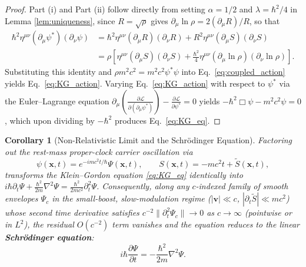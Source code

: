\documentclass[11pt, a4paper]{article}
\newtheorem{corollary}[theorem]{Corollary}
\theoremstyle{definition}
\begin{document}
\begin{proof}
Part (i) and Part (ii) follow directly from setting $\alpha = 1/2$ and $\lambda = \hbar^2/4$ in Lemma \ref{lem:uniqueness}, since $R = \sqrt{\rho}$ gives $\partial_\mu \ln\rho = 2(\partial_\mu R)/R$, so that
\begin{equation}
\begin{aligned}
\hbar^2 \eta^{\mu\nu}(\partial_\mu \psi^*)(\partial_\nu \psi) &= \hbar^2 \eta^{\mu\nu}(\partial_\mu R)(\partial_\nu R) + R^2 \eta^{\mu\nu}(\partial_\mu S)(\partial_\nu S) \\
&= \rho\left[ \eta^{\mu\nu}(\partial_\mu S)(\partial_\nu S) + \frac{\hbar^2}{4}\eta^{\mu\nu}(\partial_\mu \ln\rho)(\partial_\nu \ln\rho) \right].
\end{aligned}
\end{equation}
Substituting this identity and $\rho m^2 c^2 = m^2 c^2 \psi^* \psi$ into Eq.~\eqref{eq:coupled_action} yields Eq.~\eqref{eq:KG_action}. Varying Eq.~\eqref{eq:KG_action} with respect to $\psi^*$ via the Euler--Lagrange equation $\partial_\mu \left(\frac{\partial \mathcal{L}}{\partial(\partial_\mu \psi^*)}\right) - \frac{\partial \mathcal{L}}{\partial \psi^*} = 0$ yields $-\hbar^2 \Box \psi - m^2 c^2 \psi = 0$, which upon dividing by $-\hbar^2$ produces Eq.~\eqref{eq:KG_eq}.
\end{proof}

\begin{corollary}[Non-Relativistic Limit and the Schr\"{o}dinger Equation]
\label{cor:schrodinger}
Factoring out the rest-mass proper-clock carrier oscillation via
\begin{equation}
\psi(\mathbf{x}, t) = e^{-i m c^2 t / \hbar} \Psi(\mathbf{x}, t), \qquad S(\mathbf{x}, t) = -mc^2 t + \tilde{S}(\mathbf{x}, t),
\end{equation}
transforms the Klein--Gordon equation \eqref{eq:KG_eq} identically into $i\hbar\partial_t\Psi + \frac{\hbar^2}{2m}\nabla^2\Psi = \frac{\hbar^2}{2mc^2}\partial_t^2\Psi$. Consequently, along any $c$-indexed family of smooth envelopes $\Psi_c$ in the small-boost, slow-modulation regime ($|\mathbf{v}| \ll c$, $|\partial_t\tilde{S}| \ll mc^2$) whose second time derivative satisfies $c^{-2}\|\partial_t^2 \Psi_c\| \to 0$ as $c \to \infty$ (pointwise or in $L^2$), the residual $O(c^{-2})$ term vanishes and the equation reduces to the linear \textbf{Schr\"{o}dinger equation}:
\begin{equation}
\label{eq:schrodinger}
i\hbar \frac{\partial \Psi}{\partial t} = -\frac{\hbar^2}{2m} \nabla^2 \Psi.
\end{equation}
\end{corollary}
\end{document}
